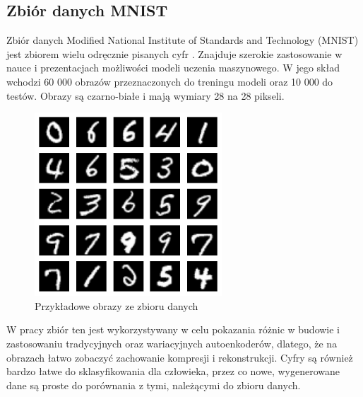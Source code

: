 \documentclass[a4paper,12pt,oneside]{book} %
\begin{document}
\subsection{Zbiór danych MNIST}
Zbiór danych Modified National Institute of Standards and Technology (MNIST) jest zbiorem wielu odręcznie pisanych cyfr \cite{mnist}. Znajduje szerokie zastosowanie w nauce i prezentacjach możliwości modeli uczenia maszynowego. W jego skład wchodzi 60 000 obrazów przeznaczonych do treningu modeli oraz 10 000 do testów. Obrazy są czarno-białe i mają wymiary 28 na 28 pikseli.
\begin{figure}[h]
	\centering\includegraphics[width=7cm]{pictures/mnist.png}
	\caption{Przykładowe obrazy ze zbioru danych}
\end{figure}

W pracy zbiór ten jest wykorzystywany w celu pokazania różnic w budowie i zastosowaniu tradycyjnych oraz wariacyjnych autoenkoderów, dlatego, że na obrazach łatwo zobaczyć zachowanie kompresji i rekonstrukcji. Cyfry są również bardzo łatwe do sklasyfikowania dla człowieka, przez co nowe, wygenerowane dane są proste do porównania z tymi, należącymi do zbioru danych.
\newpage
\end{document}
